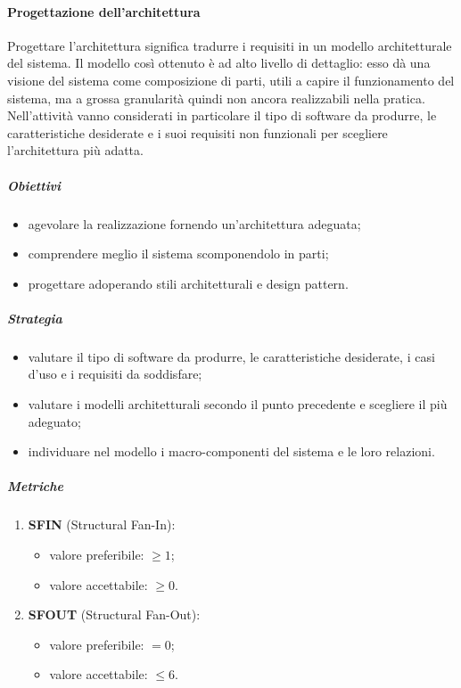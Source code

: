         \paragraph{Progettazione dell'architettura}
            Progettare l'architettura significa tradurre i requisiti in un modello architetturale del sistema.
            Il modello così ottenuto è ad alto livello di dettaglio: esso dà una visione del sistema come composizione di parti, utili a capire il funzionamento del sistema, ma a grossa granularità quindi non ancora realizzabili nella pratica.\newline
            Nell'attività vanno considerati in particolare il tipo di software da produrre, le caratteristiche desiderate e i suoi requisiti non funzionali per scegliere l'architettura più adatta.
            \subparagraph{Obiettivi}
                \begin{itemize}
                    \item agevolare la realizzazione fornendo un'architettura adeguata;
                    \item comprendere meglio il sistema scomponendolo in parti;
                    \item progettare adoperando stili architetturali e design pattern.
                \end{itemize}
            \subparagraph{Strategia}
                \begin{itemize}
                    \item valutare il tipo di software da produrre, le caratteristiche desiderate, i casi d'uso e i requisiti da soddisfare;
                    \item valutare i modelli architetturali secondo il punto precedente e scegliere il più adeguato;
                    \item individuare nel modello i macro-componenti del sistema e le loro relazioni.
                \end{itemize}
            \subparagraph{Metriche}
                \begin{enumerate}
                    \item \textbf{SFIN} (Structural Fan-In):
                    \begin{itemize}
                        \item valore preferibile: $\geq 1$;
                        \item valore accettabile: $\geq 0$.
                    \end{itemize}
                    \item \textbf{SFOUT} (Structural Fan-Out):
                    \begin{itemize}
                        \item valore preferibile: $=0$;
                        \item valore accettabile: $\leq 6$.
                    \end{itemize}
                \end{enumerate}
